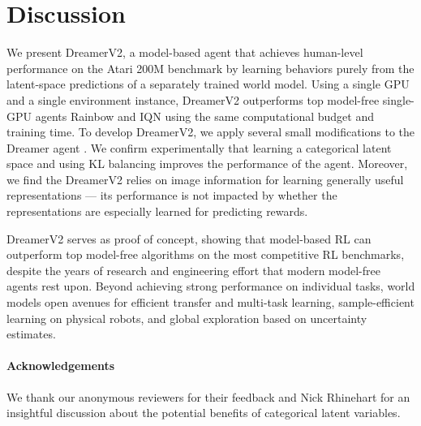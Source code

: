 \section{Discussion}
\label{sec:discussion}

We present DreamerV2, a model-based agent that achieves human-level performance on the Atari 200M benchmark by learning behaviors purely from the latent-space predictions of a separately trained world model. Using a single GPU and a single environment instance, DreamerV2 outperforms top model-free single-GPU agents Rainbow and IQN using the same computational budget and training time. To develop DreamerV2, we apply several small modifications to the Dreamer agent \citep{hafner2019dreamer}. We confirm experimentally that learning a categorical latent space and using KL balancing improves the performance of the agent. Moreover, we find the DreamerV2 relies on image information for learning generally useful representations --- its performance is not impacted by whether the representations are especially learned for predicting rewards.

DreamerV2 serves as proof of concept, showing that model-based RL can outperform top model-free algorithms on the most competitive RL benchmarks, despite the years of research and engineering effort that modern model-free agents rest upon. Beyond achieving strong performance on individual tasks, world models open avenues for efficient transfer and multi-task learning, sample-efficient learning on physical robots, and global exploration based on uncertainty estimates.

\paragraph{Acknowledgements}
We thank our anonymous reviewers for their feedback and Nick Rhinehart for an insightful discussion about the potential benefits of categorical latent variables.